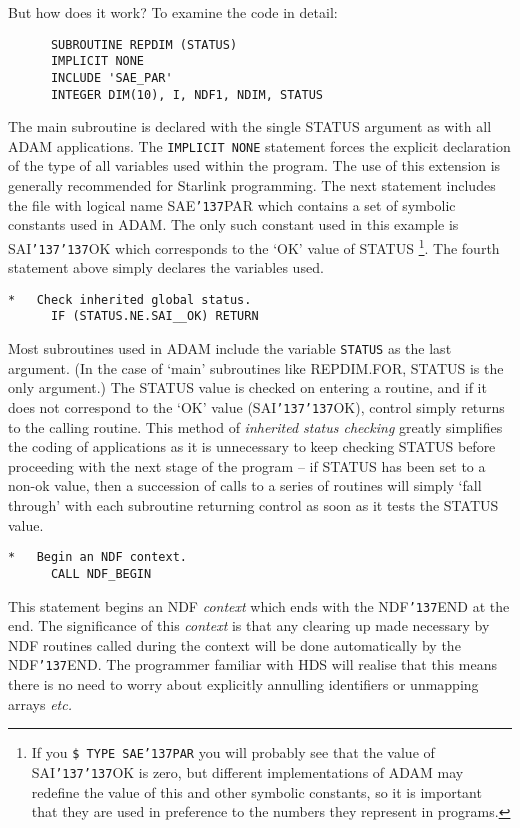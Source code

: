 \documentclass[twoside,11pt]{article}
\renewcommand{\_}{{\tt\char'137}}
\begin{document}
But how does it work?
To examine the code in detail:
\begin{verbatim}
      SUBROUTINE REPDIM (STATUS)
      IMPLICIT NONE
      INCLUDE 'SAE_PAR'
      INTEGER DIM(10), I, NDF1, NDIM, STATUS
\end{verbatim}
The  main subroutine is declared with the single STATUS argument
as with all ADAM applications.
The {\tt IMPLICIT NONE} statement forces the explicit declaration of the
type of all variables used within the program. The use of this extension
is generally recommended for Starlink programming.
The next statement includes the file with logical name SAE\_PAR which
contains a set of symbolic constants used in ADAM.
The only such constant used in this example is SAI\_\_OK
which corresponds to  the `OK' value of STATUS
\footnote{If you  {\tt \$ TYPE SAE\_PAR} you will probably
see that the value of  SAI\_\_OK  is zero, but different implementations
of ADAM may redefine the value of this and other symbolic  constants,
so it is important
that they are used in preference to the numbers they represent in programs.}.
The fourth statement above simply declares the variables used.
\begin{verbatim}
*   Check inherited global status.
      IF (STATUS.NE.SAI__OK) RETURN
\end{verbatim}
Most subroutines used in ADAM include the variable {\tt STATUS} as the last
argument. (In the case of `main' subroutines like REPDIM.FOR, STATUS is the
only argument.)
The STATUS value is checked on entering a routine, and if it does not
correspond to the `OK' value (SAI\_\_OK),  control simply
returns to the calling routine.
This method of {\sl inherited status checking\/}  greatly simplifies the
coding of applications as it is unnecessary to keep checking STATUS
before proceeding with the next stage of the program --
if STATUS has been set to a non-ok value, then  a
succession of calls to a series of routines will simply `fall through'
with each subroutine returning control as soon as it tests the STATUS
value.
\begin{verbatim}
*   Begin an NDF context.
      CALL NDF_BEGIN
\end{verbatim}
This statement begins an NDF {\sl context\/} which ends with the
NDF\_END at the end.
The significance of this {\sl context\/} is that any
clearing up made necessary by NDF routines called
during the context will be done automatically by the NDF\_END.
The programmer familiar with HDS will realise that this means
there is no need to worry about explicitly
annulling identifiers or unmapping arrays {\it etc.}
\end{document}
